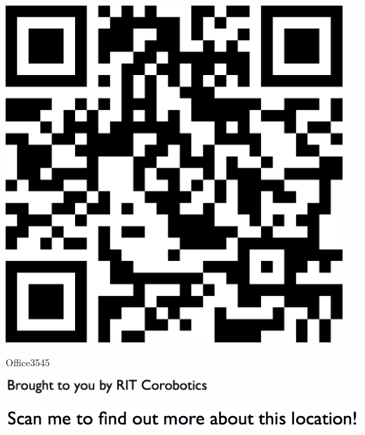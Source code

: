 \documentclass[letterpaper]{article}
\begin{document}
 \begingroup 
 \centerline{\includegraphics[scale=1,width=5in,height=5in]{Office3545.png}} 
 \endgroup 
 \vspace*{\fill} 

 \hfill{\small Office3545} 

  \vspace{0.7in} 
 
 \centerline{\includegraphics[scale=1,width=3in]{text-bottom.png}} 
 
 \pagebreak 
{} 
 \vspace*{\fill} 
 
  \centerline{\includegraphics[scale=1,width=6in]{text-top.png}} 
 
 \vspace{0.5in} 
 
\end{document}

